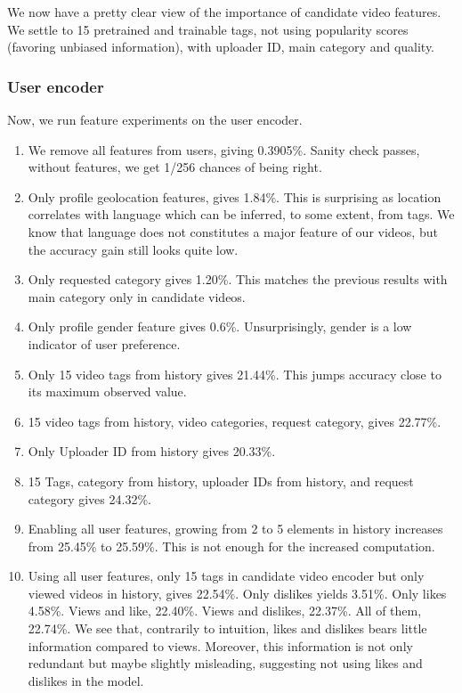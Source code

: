 We now have a pretty clear view of the importance of candidate video features. We settle to 15 pretrained and trainable tags, not using popularity scores (favoring unbiased information), with uploader ID, main category and quality.

\subsubsection{User encoder}

Now, we run feature experiments on the user encoder.

\begin{enumerate}
    \item We remove all features from users, giving 0.3905\%. Sanity check passes, without features, we get 1/256 chances of being right.
    \item Only profile geolocation features, gives 1.84\%. This is surprising as location correlates with language which can be inferred, to some extent, from tags. We know that language does not constitutes a major feature of our videos, but the accuracy gain still looks quite low.
    \item Only requested category gives 1.20\%. This matches the previous results with main category only in candidate videos.
    \item Only profile gender feature gives 0.6\%. Unsurprisingly, gender is a low indicator of user preference.
    \item Only 15 video tags from history gives 21.44\%. This jumps accuracy close to its maximum observed value.
    \item 15 video tags from history, video categories, request category, gives 22.77\%.
    \item Only Uploader ID from history gives 20.33\%.
    \item 15 Tags, category from history, uploader IDs from history, and request category gives 24.32\%.
    \item Enabling all user features, growing from 2 to 5 elements in history increases from 25.45\% to 25.59\%. This is not enough for the increased computation.
    \item Using all user features, only 15 tags in candidate video encoder but only viewed videos in history, gives 22.54\%. Only dislikes yields 3.51\%. Only likes 4.58\%. Views and like, 22.40\%. Views and dislikes, 22.37\%. All of them, 22.74\%. We see that, contrarily to intuition, likes and dislikes bears little information compared to views. Moreover, this information is not only redundant but maybe slightly misleading, suggesting not using likes and dislikes in the model.

\end{enumerate}

